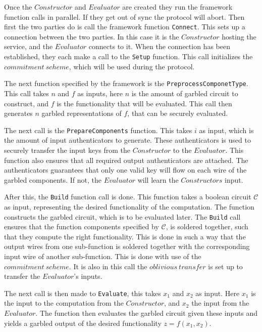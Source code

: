 \documentclass[twoside,11pt,openright]{report}
\begin{document}
Once the $Constructor$ and $Evaluator$ are created they run the framework function calls in parallel. If they get out of sync the protocol will abort. Then first the two parties do is call the framework function \verb|Connect|. This sets up a connection between the two parties. In this case it is the $Constructor$ hosting the service, and the $Evaluator$ connects to it. When the connection has been established, they each make a call to the \verb|Setup| function. This call initializes the $commitment~scheme$, which will be used during the protocol.

The next function specified by the framework is the \verb|PreprocessComponetType|. This call takes $n$ and $f$ as inputs, here $n$ is the amount of garbled circuit to construct, and $f$ is the functionality that will be evaluated. This call then generates $n$ garbled representations of $f$, that can be securely evaluated.

The next call is the \verb|PrepareComponents| function. This takes $i$ as input, which is the amount of input authenticators to generate. These authenticators is used to securely transfer the input keys from the $Constructor$ to the $Evaluator$. This function also ensures that all required output authenticators are attached. The authenticators guarantees that only one valid key will flow on each wire of the garbled components. If not, the $Evaluator$ will learn the $Constructors$ input.

After this, the \verb|Build| function call is done. This function takes a boolean circuit $\mathcal{C}$ as input, representing the desired functionality of the computation. The function constructs the garbled circuit, which is to be evaluated later. The \verb|Build| call ensures that the function components specified by $\mathcal{C}$, is soldered together, such that they compute the right functionality. This is done in such a way that the output wires from one sub-function is soldered together with the corresponding input wire of another sub-function. This is done with use of the $commitment~scheme$. It is also in this call the $oblivious~transfer$ is set up to transfer the $Evaluator$'s inputs.

The next call is then made to \verb|Evaluate|, this takes $x_1$ and $x_2$ as input. Here $x_1$ is the input to the computation from the $Constructor$, and $x_2$ the input from the $Evaluator$. The function then evaluates the garbled circuit given these inputs and yields a garbled output of the desired functionality $z=f(x_1,x_2)$.
\end{document}
